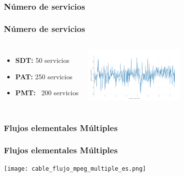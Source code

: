 \documentclass[a4paper,11pt]{beamer}
\begin{document}
		\subsubsection{Número de servicios}
		\begin{frame}
			\frametitle{Número de servicios}
			\begin{columns}
				\begin{itemize}
					\item \textbf{SDT:} 50 servicios
					\item \textbf{PAT:} 250 servicios
					\item \textbf{PMT:} ~200 servicios
				\end{itemize}
				\begin{center}
					\includegraphics[width=5cm]{nulos_disponibles.png}
				\end{center}
			\end{columns}
		\end{frame}

		\subsubsection{Flujos elementales Múltiples}
		\begin{frame}
			\frametitle{Flujos elementales Múltiples}
			\begin{center}
					\texttt{[image: cable\_flujo\_mpeg\_multiple\_es.png]}
				\end{center}
		\end{frame}
\end{document}
